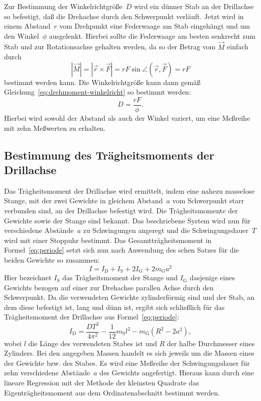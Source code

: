 Zur Bestimmung der Winkelrichtgröße~$D$ wird ein dünner Stab an der
Drillachse so befestigt, daß die Drehachse durch den Schwerpunkt
verläuft.  Jetzt wird in einem Abstand~$r$ vom Drehpunkt eine Federwaage
am Stab eingehängt und um den Winkel~$\phi$ ausgelenkt.  Hierbei sollte
die Federwaage am besten senkrecht zum Stab und zur Rotationsachse
gehalten werden, da so der Betrag vom $\vec{M}$ einfach durch
\begin{equation}
  | \vec{M} | = | \vec{r} \times \vec{F} | = r F \sin \angle(\vec{r},
  \vec{F}) = r F
\end{equation}
bestimmt werden kann.  Die Winkelrichtgröße kann dann gemäß
Gleichung~\eqref{eq:drehmoment-winkelricht} so bestimmt werden:
\begin{equation}
  \label{eq:winkelricht-kraft-abstand-winkel}
  D = \frac{r F}{\phi}.
\end{equation}
Hierbei wird sowohl der Abstand als auch der Winkel variert, um eine
Meßreihe mit zehn Meßwerten zu erhalten.

\subsection{Bestimmung des Trägheitsmoments der Drillachse}

Das Trägheitsmoment der Drillachse wird ermittelt, indem eine nahezu
masselose Stange, mit der zwei Gewichte in gleichem Abstand~$a$ vom
Schwerpunkt starr verbunden sind, an der Drillachse befestigt wird.  Die
Trägheitsmomente der Gewichte sowie der Stange sind bekannt.  Das
beschriebene System wird nun für verschiedene Abstände~$a$ zu
Schwingungen angeregt und die Schwingungsdauer~$T$ wird mit einer
Stoppuhr bestimmt.  Das Gesamtträgheitsmoment in
Formel~\eqref{eq:periode} setzt sich nun nach Anwendung des
schen Satzes für die beiden Gewichte so zusammen:
\begin{equation}
  I = I_\text{D} + I_\text{S} + 2I_\text{G} + 2m_\text{G} a^2
\end{equation}
Hier bezeichnet $I_\text{S}$ das Trägheitsmoment der Stange und
$I_\text{G}$ dasjenige eines Gewichts bezogen auf einer zur Drehachse
parallen Achse durch den Schwerpunkt.  Da die verwendeten Gewichte
zylinderförmig sind und der Stab, an dem diese befestigt ist, lang und
dünn ist, ergibt sich schließlich für das Trägheitsmoment der Drillachse
aus Formel~\eqref{eq:periode}:
\begin{equation}
  \label{eq:traegheit-drillachse}
  I_\text{D} = \frac{D T^2}{4 \pi^2} - \frac{1}{12} m_\text{S} l^2 -
  m_\text{G} (R^2 - 2 a^2),
\end{equation}
wobei $l$ die Länge des verwendeten Stabes ist und $R$ der halbe
Durchmesser eines Zylinders.  Bei den angegeben Massen handelt es sich
jeweils um die Massen eines der Gewichte bzw. des Stabes.  Es wird eine
Meßreihe der Schwingungsdauer für zehn verschiedene Abstände~$a$ des
Gewichts angefertigt.  Hieraus kann durch eine lineare Regression mit
der Methode der kleinsten Quadrate das Eigenträgheitsmoment aus dem
Ordinatenabschnitt bestimmt werden.

